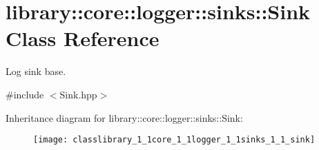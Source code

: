 \hypertarget{classlibrary_1_1core_1_1logger_1_1sinks_1_1_sink}{}\section{library\+:\+:core\+:\+:logger\+:\+:sinks\+:\+:Sink Class Reference}
\label{classlibrary_1_1core_1_1logger_1_1sinks_1_1_sink}


Log sink base.  




{\ttfamily \#include $<$Sink.\+hpp$>$}

Inheritance diagram for library\+:\+:core\+:\+:logger\+:\+:sinks\+:\+:Sink\+:\begin{figure}[H]
\begin{center}
\leavevmode
\texttt{[image: classlibrary\_1\_1core\_1\_1logger\_1\_1sinks\_1\_1\_sink]}
\end{center}
\end{figure}
